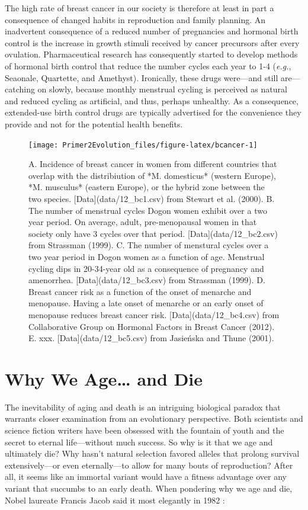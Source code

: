 \documentclass[
]{book}
\begin{document}
The high rate of breast cancer in our society is therefore at least in part a consequence of changed habits in reproduction and family planning. An inadvertent consequence of a reduced number of pregnancies and hormonal birth control is the increase in growth stimuli received by cancer precursors after every ovulation. Pharmaceutical research has consequently started to develop methods of hormonal birth control that reduce the number cycles each year to 1-4 (\emph{e.g.}, Seaonale, Quartette, and Amethyst). Ironically, these drugs were---and still are---catching on slowly, because monthly menstrual cycling is perceived as natural and reduced cycling as artificial, and thus, perhaps unhealthy. As a consequence, extended-use birth control drugs are typically advertised for the convenience they provide and not for the potential health benefits.

\begin{figure}
\texttt{[image: Primer2Evolution\_files/figure-latex/bcancer-1]} \caption{A. Incidence of breast cancer in women from different countries that overlap with the distribiution of *M. domesticus* (western Europe), *M. musculus* (eastern Europe), or the hybrid zone between the two species. [Data](data/12_bc1.csv) from Stewart et al. (2000). B. The number of menstrual cycles Dogon women exhibit over a two year period. On average, adult, pre-menopausal women in that society only have 3 cycles over that period. [Data](data/12_bc2.csv) from Strassman (1999). C. The number of menstural cycles over a two year period in Dogon women as a function of age. Menstrual cycling dips in 20-34-year old as a consequence of pregnancy and amenorrhea. [Data](data/12_bc3.csv) from Strassman (1999). D. Breast cancer risk as a function of the onset of menarche and menopause. Having a late onset of menarche or an early onset of menopause reduces breast cancer risk. [Data](data/12_bc4.csv) from Collaborative Group on Hormonal Factors in Breast Cancer (2012). E. xxx. [Data](data/12_bc5.csv) from Jasieńska and Thune (2001).}\label{fig:bcancer}
\end{figure}

\hypertarget{why-we-age-and-die}{%
\section{Why We Age\ldots{} and Die}\label{why-we-age-and-die}}

The inevitability of aging and death is an intriguing biological paradox that warrants closer examination from an evolutionary perspective. Both scientists and science fiction writers have been obsessed with the fountain of youth and the secret to eternal life---without much success. So why is it that we age and ultimately die? Why hasn't natural selection favored alleles that prolong survival extensively---or even eternally---to allow for many bouts of reproduction? After all, it seems like an immortal variant would have a fitness advantage over any variant that succumbs to an early death. When pondering why we age and die, Nobel laureate Francis Jacob said it most elegantly in 1982 :
\end{document}
